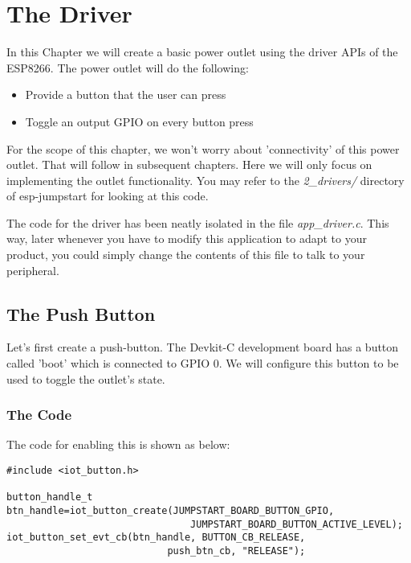 \documentclass[main.tex]{subfiles}
\begin{document}
\chapter{The Driver} \label{the-outlet}

In this Chapter we will create a basic power outlet using the driver APIs of the ESP8266. The power outlet will do the following:
\begin{itemize}
    \item Provide a button that the user can press
    \item Toggle an output GPIO on every button press
\end{itemize}
For the scope of this chapter, we won't worry about 'connectivity' of this power outlet. That will follow in subsequent chapters. Here we will only focus on implementing the outlet functionality. You may refer to the \textit{2\_drivers/} directory of esp-jumpstart for looking at this code. 

The code for the driver has been neatly isolated in the file \textit{app\_driver.c}. This way, later whenever you have to modify this application to adapt to your product, you could simply change the contents of this file to talk to your peripheral.

\section{The Push Button}
Let's first create a push-button. The Devkit-C development board has a button called 'boot' which is connected to GPIO 0. We will configure this button to be used to toggle the outlet's state.


\subsection{The Code}\label{sec:push_button}
The code for enabling this is shown as below:
\begin{verbatim}
#include <iot_button.h>

button_handle_t btn_handle=iot_button_create(JUMPSTART_BOARD_BUTTON_GPIO,
                                JUMPSTART_BOARD_BUTTON_ACTIVE_LEVEL);
iot_button_set_evt_cb(btn_handle, BUTTON_CB_RELEASE,
                            push_btn_cb, "RELEASE");

\end{verbatim}
\end{document}
